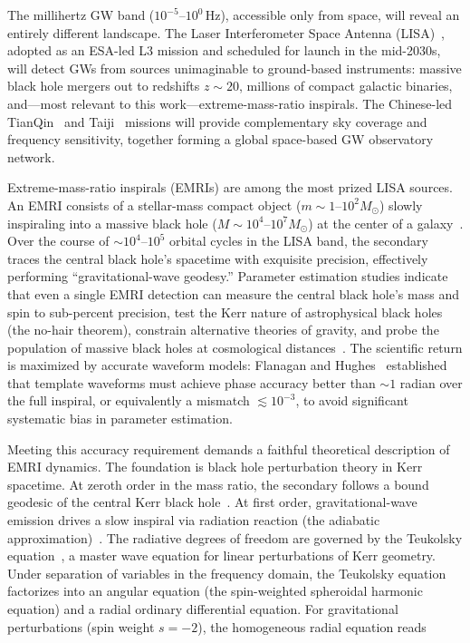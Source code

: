 \documentclass[aps,prd,twocolumn,superscriptaddress,nofootinbib]{revtex4-2}
\begin{document}
The millihertz GW band ($10^{-5}$--$10^{0}\,\text{Hz}$), accessible only from
space, will reveal an entirely different landscape.  The Laser Interferometer
Space Antenna (LISA)~\cite{AmaroSeoane:2017lisa}, adopted as an ESA-led L3
mission and scheduled for launch in the mid-2030s, will detect GWs from sources
unimaginable to ground-based instruments: massive black hole mergers out to
redshifts $z \sim 20$, millions of compact galactic binaries, and---most relevant
to this work---extreme-mass-ratio inspirals.  The Chinese-led
TianQin~\cite{Luo:2016tianqin} and Taiji~\cite{Hu:2017taiji} missions will
provide complementary sky coverage and frequency sensitivity, together forming a
global space-based GW observatory network.

Extreme-mass-ratio inspirals (EMRIs) are among the most prized LISA sources.  An
EMRI consists of a stellar-mass compact object ($m \sim 1$--$10^2 M_\odot$)
slowly inspiraling into a massive black hole ($M \sim 10^{4}$--$10^{7} M_\odot$)
at the center of a galaxy~\cite{Barack:2004emri,AmaroSeoane:2017lisa}.  Over the
course of $\sim 10^{4}$--$10^{5}$ orbital cycles in the LISA band, the secondary
traces the central black hole's spacetime with exquisite precision, effectively
performing ``gravitational-wave geodesy.''  Parameter estimation studies
indicate that even a single EMRI detection can measure the central black hole's
mass and spin to sub-percent precision, test the Kerr nature of astrophysical
black holes (the no-hair theorem), constrain alternative theories of gravity, and
probe the population of massive black holes at cosmological
distances~\cite{Barack:2019sf,Berti:2009qnm,Babak:2017tow}.  The scientific
return is maximized by accurate waveform models: Flanagan and
Hughes~\cite{Flanagan:1998acc} established that template waveforms must achieve
phase accuracy better than $\sim 1$ radian over the full inspiral, or
equivalently a mismatch $\lesssim 10^{-3}$, to avoid significant systematic bias
in parameter estimation.

Meeting this accuracy requirement demands a faithful theoretical description of
EMRI dynamics.  The foundation is black hole perturbation theory in Kerr
spacetime.  At zeroth order in the mass ratio, the secondary follows a bound
geodesic of the central Kerr black hole~\cite{Fujita:2009geodesic}.  At first
order, gravitational-wave emission drives a slow inspiral via radiation reaction
(the adiabatic approximation)~\cite{Hughes:2005adi,Detweiler:1978bhgw}.  The
radiative degrees of freedom are governed by the Teukolsky
equation~\cite{Teukolsky:1973ha}, a master wave equation for linear perturbations
of Kerr geometry.  Under separation of variables in the frequency domain, the
Teukolsky equation factorizes into an angular equation (the spin-weighted
spheroidal harmonic equation) and a radial ordinary differential equation.  For
gravitational perturbations (spin weight $s=-2$), the homogeneous radial equation
reads
\end{document}
